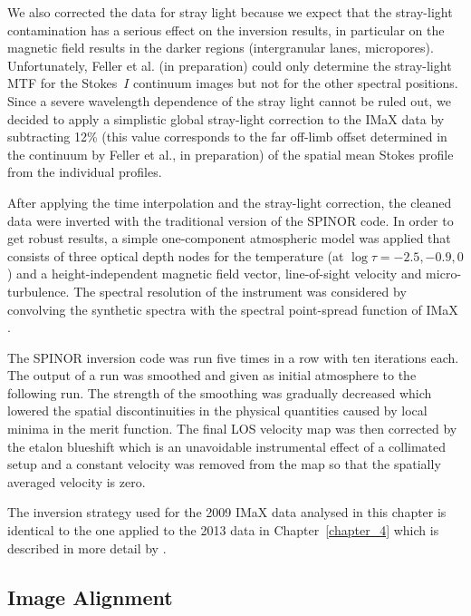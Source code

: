 \documentclass[goettingen, gauss, print]{thesis}
\begin{document}
We also corrected the data for stray light because we expect that the stray-light contamination has a serious effect on the inversion results,
in particular on the magnetic field results in the darker regions (intergranular lanes, micropores). Unfortunately, Feller et al. (in preparation)
could only determine the stray-light MTF for the Stokes~$I$ continuum images but not for the other spectral positions. Since a severe
wavelength dependence of the stray light cannot be ruled out, we decided to apply a simplistic global stray-light correction to the IMaX
data by subtracting 12\% (this value corresponds to the far off-limb offset determined in the continuum by Feller et al., in preparation) of the spatial mean
Stokes profile from the individual profiles.

After applying the time interpolation and the stray-light correction, the cleaned data were inverted with the traditional version of the SPINOR code.
In order to get robust results, a simple one-component atmospheric model was applied that consists of three optical depth nodes for the temperature
(at $\log\tau=-2.5, -0.9, 0$) and a height-independent magnetic field vector, line-of-sight velocity and micro-turbulence. The spectral resolution
of the instrument was considered by convolving the synthetic spectra with the spectral point-spread function of IMaX \citep[see bottom panel of
Fig.~1 in][]{riethmuller_comparison_2014}.

The SPINOR inversion code was run five times in a row with ten iterations each. The output of a run was smoothed and given as initial atmosphere
to the following run. The strength of the smoothing was gradually decreased which lowered the spatial discontinuities in the physical quantities caused
by local minima in the merit function. The final LOS velocity map was then corrected by the etalon blueshift which is an unavoidable instrumental effect
of a collimated setup \citep[see][]{martinezpillet_imaging_2011} and a constant velocity was removed from the map so that the spatially averaged velocity is zero.

The inversion strategy used for the 2009 IMaX data analysed in this chapter is identical to the one applied to the 2013 data in Chapter~\ref{chapter_4} which is described in more detail
by \cite{solanki_second_2017}.


\subsection{Image Alignment}
\end{document}
